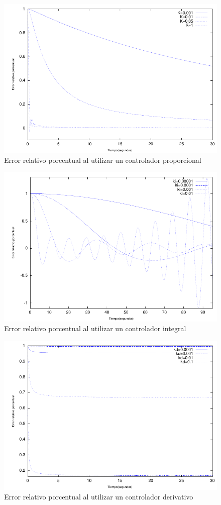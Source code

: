 \documentclass{sig-alternate}
\begin{document}
\begin{figure}[hp]
\label{errorMProporcional}
\centering
\includegraphics[scale=0.8]{graficos/errorMProporcional}
\caption{Error relativo porcentual al utilizar un controlador proporcional}
\end{figure}

\begin{figure}[hp]
\label{errorMIntegral}
\centering
\includegraphics[scale=0.8]{graficos/errorMIntegral}
\caption{Error relativo porcentual al utilizar un controlador integral}
\end{figure}

\begin{figure}[hp]
\label{errorMDerivativo}
\centering
\includegraphics[scale=0.8]{graficos/errorMDerivativo}
\caption{Error relativo porcentual al utilizar un controlador derivativo}
\end{figure}
\end{document}
